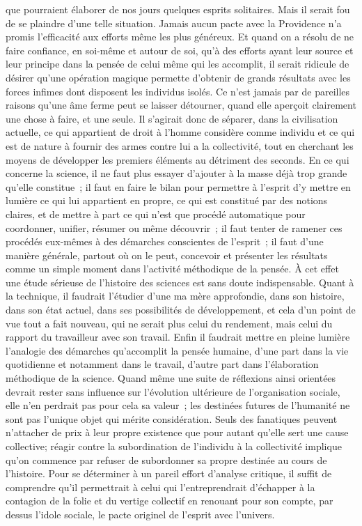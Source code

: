 \documentclass[french,twoside]{book} %
\begin{document}
que pourraient élaborer de nos jours quelques esprits solitaires. Mais il serait fou de se plaindre d'une telle situation. Jamais aucun pacte avec la Providence n'a promis l'efficacité aux efforts même les plus généreux. Et quand on a résolu de ne faire confiance, en soi-même et autour de soi, qu'à des efforts ayant leur source et leur principe dans la pensée de celui même qui les accomplit, il serait ridicule de désirer qu'une opération magique permette d'obtenir de grands résultats avec les forces infimes dont disposent les individus isolés. Ce n'est jamais par de pareilles raisons qu'une âme ferme peut se laisser détourner, quand elle aperçoit clairement une chose à faire, et une seule. Il s'agirait donc de séparer, dans la civilisation actuelle, ce qui appartient de droit à l'homme considère comme individu et ce qui est de nature à fournir des armes contre lui a la collectivité, tout en cherchant les moyens de développer les premiers éléments au détriment des seconds. En ce qui concerne la science, il ne faut plus essayer d'ajouter à la masse déjà trop grande qu'elle constitue ; il faut en faire le bilan pour permettre à l'esprit d'y mettre en lumière ce qui lui appartient en propre, ce qui est constitué par des notions claires, et de mettre à part ce qui n'est que procédé automatique pour coordonner, unifier, résumer ou même découvrir ; il faut tenter de ramener ces procédés eux-mêmes à des démarches conscientes de l'esprit ; il faut d'une manière générale, partout où on le peut, concevoir et présenter les résultats comme un simple moment dans l'activité méthodique de la pensée. À cet effet une étude sérieuse de l'histoire des sciences est sans doute indispensable. Quant à la technique, il faudrait l'étudier d'une ma mère approfondie, dans son histoire, dans son état actuel, dans ses possibilités de développement, et cela d'un point de vue tout a fait nouveau, qui ne serait plus celui du rendement, mais celui du rapport du travailleur avec son travail. Enfin il faudrait mettre en pleine lumière l'analogie des démarches qu'accomplit la pensée humaine, d'une part dans la vie quotidienne et notamment dans le travail, d'autre part dans l'élaboration méthodique de la science. Quand même une suite de réflexions ainsi orientées devrait rester sans influence sur l'évolution ultérieure de l'organisation sociale, elle n'en perdrait pas pour cela sa valeur ; les destinées futures de l'humanité ne sont pas l'unique objet qui mérite considération. Seuls des fanatiques peuvent n'attacher de prix à leur propre existence que pour autant qu'elle sert une cause collective; réagir contre la subordination de l'individu à la collectivité implique qu'on commence par refuser de subordonner sa propre destinée au cours de l'histoire. Pour se déterminer à un pareil effort d'analyse critique, il suffit de comprendre qu'il permettrait à celui qui l'entreprendrait d'échapper à la contagion de la folie et du vertige collectif en renouant pour son compte, par dessus l'idole sociale, le pacte originel de l'esprit avec l'univers.\par
\end{document}
